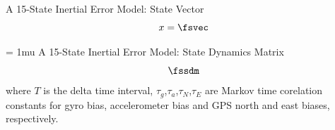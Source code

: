 \begin{frame}
A 15-State Inertial Error Model: State Vector
\[x=\fsvec\]
\end{frame}

\begin{frame}
\footnotesize 
\setlength{\arraycolsep}{2.5pt} 
\medmuskip = 1mu %
A 15-State Inertial Error Model: State Dynamics Matrix
\[\fssdm\]
where $T$ is the delta time interval, $\tau_g$,$\tau_a$,$\tau_N$,$\tau_E$ are Markov time corelation constants 
for gyro bias, accelerometer bias and GPS north and east biases, respectively. 
\end{frame}



